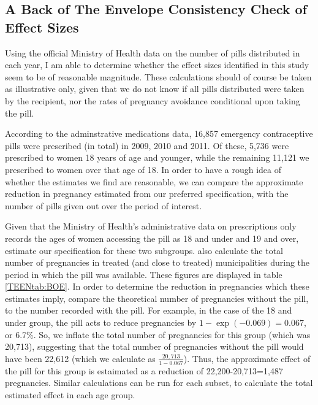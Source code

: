 \begin{spacing}{1.4}
\section{A Back of The Envelope Consistency Check of Effect Sizes}
\label{TEENscn:BOE}
Using the official Ministry of Health data on the number of pills distributed
in each year, I am able to determine whether the effect sizes identified in
this study seem to be of reasonable magnitude.  These calculations should of
course be taken as illustrative only, given that we do not know if all pills
distributed were taken by the recipient, nor the rates of pregnancy avoidance
conditional upon taking the pill.

According to the adminstrative medications data, 16,857 emergency 
contraceptive pills were prescribed (in total) in 2009, 2010 and 2011. Of 
these, 5,736 were prescribed to women 18 years of age and younger, while the
remaining 11,121 we prescribed to women over that age of 18.  In order to have
a rough idea of whether the estimates we find are reasonable, we can compare
the approximate reduction in pregnancy estimated from our preferred 
specification, with the number of pills given out over the period of interest.

Given that the Ministry of Health's administrative data on prescriptions only
records the ages of women accessing the pill as 18 and under and 19 and over,
\person estimate our specification for these two subgroups.  \Person also
calculate the total number of pregnancies in treated (and close to treated)
municipalities during the period in which the pill was available.  These 
figures are displayed in table \ref{TEENtab:BOE}.  In order to determine the
reduction in pregnancies which these estimates imply, \person compare the 
theoretical number of pregnancies without the pill, to the number recorded 
with the pill.  For example, in the case of the 18 and under group, the pill acts 
to reduce pregnancies by $1-\exp(-0.069)=0.067$, or 6.7\%.  So, we inflate the 
total number of pregnancies for this group (which was 20,713), suggesting that 
the total number of pregnancies without the pill would have been 22,612 (which
we calculate as $\frac{20,713}{1-0.067}$).  Thus, the approximate effect of the 
pill for this group is estaimated as a reduction of 22,200-20,713=1,487
pregnancies.  Similar calculations can be run for each subset, to calculate the
total estimated effect in each age group.


\end{spacing}
